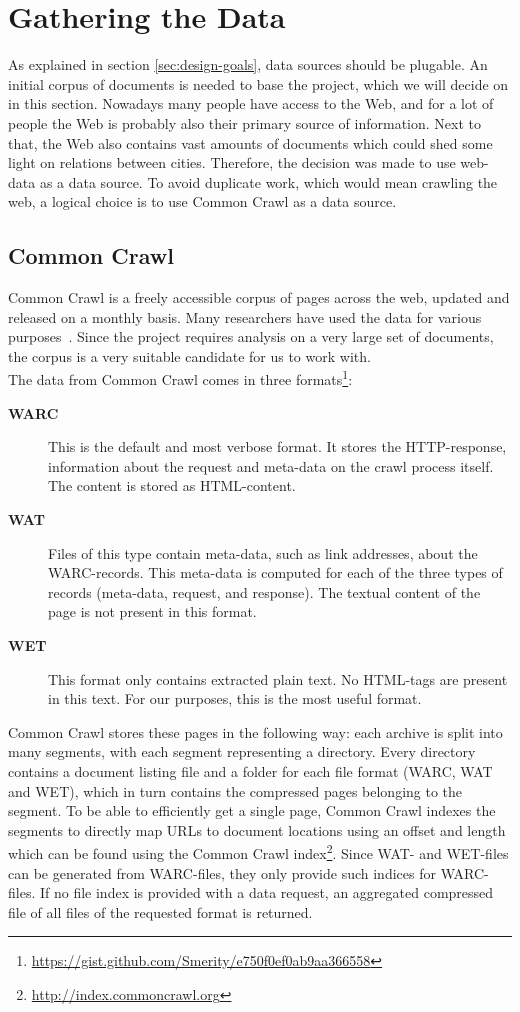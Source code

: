 \section{Gathering the Data}
As explained in section \ref{sec:design-goals}, data sources should be plugable. An initial corpus of documents is needed to base the project, which we will decide on in this section. Nowadays many people have access to the Web, and for a lot of people the Web is probably also their primary source of information. Next to that, the Web also contains vast amounts of documents which could shed some light on relations between cities. Therefore, the decision was made to use web-data as a data source. To avoid duplicate work, which would mean crawling the web, a logical choice is to use Common Crawl as a data source.

\subsection{Common Crawl} \label{sec:commoncrawl}
Common Crawl \cite{commoncrawl} is a freely accessible corpus of pages across the web, updated and released on a monthly basis. Many researchers have used the data for various purposes~\cite{smith2013dirt, muhleisen2012web, singh2012wikilinks}. Since the project requires analysis on a very large set of documents, the corpus is a very suitable candidate for us to work with. \\

The data from Common Crawl comes in three    formats\footnote{\url{https://gist.github.com/Smerity/e750f0ef0ab9aa366558}}: 
\begin{description}
\item[\textbf{WARC}] This is the default and most verbose format. It stores the HTTP-response, information about the request and meta-data on the crawl process itself. The content is stored as HTML-content.
\item[\textbf{WAT}] Files of this type contain meta-data, such as link addresses, about the WARC-records. This meta-data is computed for each of the three types of records (meta-data, request, and response). The textual content of the page is not present in this format.
\item[\textbf{WET}] This format only contains extracted plain text. No HTML-tags are present in this text. For our purposes, this is the most useful format.
\end{description}

Common Crawl stores these pages in the following way: each archive is split into many segments, with each segment representing a directory. Every directory contains a document listing file and a folder for each file format (WARC, WAT and WET), which in turn contains the compressed pages belonging to the segment. To be able to efficiently get a single page, Common Crawl indexes the segments to directly map URLs to document locations using an offset and length which can be found using the Common Crawl index\footnote{\url{http://index.commoncrawl.org}}. Since WAT- and WET-files can be generated from WARC-files, they only provide such indices for WARC-files. If no file index is provided with a data request, an aggregated compressed file of all files of the requested format is returned.

